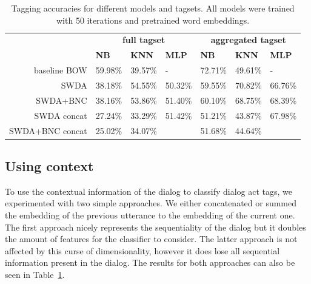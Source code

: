 \begin{table}[]
\centering
\begin{tabular}{r|lll|lll}
                   & \multicolumn{3}{c|}{\textbf{full tagset}} & \multicolumn{3}{c}{\textbf{aggregated tagset}} \\
                   & \textbf{NB}      & \textbf{KNN}     & \textbf{MLP}     & \textbf{NB}     & \textbf{KNN}     & \textbf{MLP}     \\
\hline
baseline BOW      & 59.98\%  & 39.57\% & -       & 72.71\%& 49.61\% &  -         \\
SWDA               & 38.18\%        & 54.55\%        &  50.32\%       &  59.55\%      &  70.82\%       &  66.76\%       \\
SWDA+BNC         & 38.16\%        &  53.86\%       &  51.40\%       &  60.10\%      &  68.75\%       &  68.39\%       \\
SWDA concat      & 27.24\%        & 33.29\%        &  51.42\%       & 51.21\%       &  43.87\%       &  67.98\%       \\
SWDA+BNC concat  & 25.02\%        & 34.07\%        &                & 51.68\%       & 44.64\%        &                 \\
\end{tabular}
\caption{Tagging accuracies for different models and tagsets. All models were trained with 50 iterations and pretrained word embeddings.}
\label{tab:results}
\end{table}


\subsection{Using context}
To use the contextual information of the dialog to classify dialog act tags, we experimented with two simple approaches. We either concatenated or summed the embedding of the previous utterance to the embedding of the current one.
The first approach nicely represents the sequentiality of the dialog but it doubles the amount of features for the classifier to consider.
The latter approach is not affected by this curse of dimensionality, however it does lose all sequential information present in the dialog.
The results for both approaches can also be seen in Table~\ref{tab:results}.

